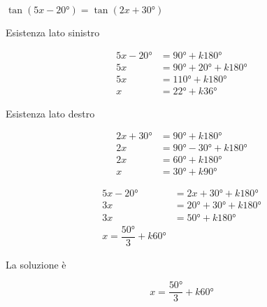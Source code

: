 	$\tan(5x-\ang{20;;})=\tan(2x+\ang{30;;})$

	Esistenza lato sinistro

		\begin{align*}
		5x-\ang{20;;}&=\ang{90;;}+k\ang{180;;}\\
		5x&=\ang{90;;}+\ang{20;;}+k\ang{180;;}\\
		5x&=\ang{110;;}+k\ang{180;;}\\
	 x&=\ang{22;;}+k\ang{36;;}
		\end{align*}

	Esistenza lato destro

	\begin{align*}
	2x+\ang{30;;}&=\ang{90;;}+k\ang{180;;}\\
	2x&=\ang{90;;}-\ang{30;;}+k\ang{180;;}\\
	2x&=\ang{60;;}+k\ang{180;;}\\
	x&=\ang{30;;}+k\ang{90;;}
	\end{align*}


	\begin{align*}
	5x-\ang{20;;}&=2x+\ang{30;;}+k\ang{180;;}\\
	3x&=\ang{20;;}+\ang{30;;}+k\ang{180;;}\\
	3x&=\ang{50;;}+k\ang{180;;}\\
	x =\dfrac{\ang{50;;}}{3}+k\ang{60;;}
	\end{align*}

	La soluzione è

\[x =\dfrac{\ang{50;;}}{3}+k\ang{60;;}\]
